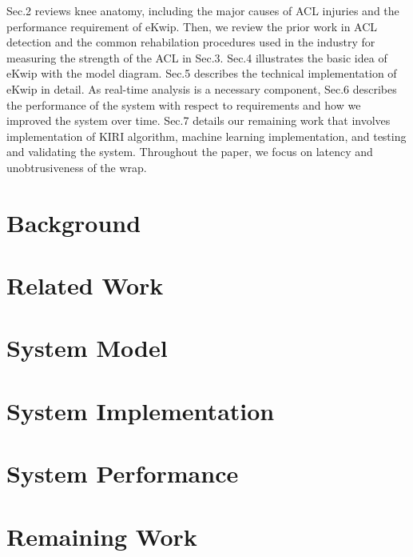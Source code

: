 \documentclass{sig-alternate}
\begin{document}
Sec.2 reviews knee anatomy, including the major causes of ACL injuries and the performance requirement of eKwip. Then, we review the prior work in ACL detection and the common rehabilation procedures used in the industry for measuring the strength of the ACL in Sec.3. Sec.4 illustrates the basic idea of eKwip with the model diagram. Sec.5 describes the technical implementation of eKwip in detail. As real-time analysis is a necessary component, Sec.6 describes the performance of the system with respect to requirements and how we improved the system over time. Sec.7 details our remaining work that involves implementation of KIRI algorithm, machine learning implementation, and testing and validating the system. Throughout the paper, we focus on latency and unobtrusiveness of the wrap.

\section{Background}
\label{sec:background}


\section{Related Work}
\label{sec:related_work}


\section{System Model}
\label{sec:system_model}


\section{System Implementation}
\label{sec:system_implementation}


\section{System Performance}
\label{sec:system_performance}


\section{Remaining Work}
\label{sec:remaining_work}


\end{document}
